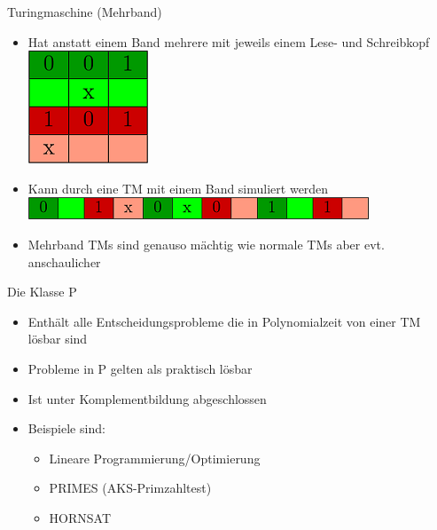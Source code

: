 \documentclass[ignorenonframetext,]{beamer}
\begin{document}
\begin{frame}{Turingmaschine (Mehrband)}

\begin{itemize}
\itemsep1pt\parskip0pt
\item
  Hat anstatt einem Band mehrere mit jeweils einem Lese- und
  Schreibkopf\\\includegraphics{img/TM1.png}
\item
  Kann durch eine TM mit einem Band simuliert
  werden\\\includegraphics{img/TM2.png}
\item
  Mehrband TMs sind genauso mächtig wie normale TMs aber evt.
  anschaulicher
\end{itemize}

\end{frame}

\begin{frame}{Die Klasse P}

\begin{itemize}
\itemsep1pt\parskip0pt
\item
  Enthält alle Entscheidungsprobleme die in Polynomialzeit von einer TM
  lösbar sind
\item
  Probleme in P gelten als praktisch lösbar
\item
  Ist unter Komplementbildung abgeschlossen
\item
  Beispiele sind:

  \begin{itemize}
  \itemsep1pt\parskip0pt
  \item
    Lineare Programmierung/Optimierung
  \item
    PRIMES (AKS-Primzahltest)
  \item
    HORNSAT
  \end{itemize}
\end{itemize}

\end{frame}
\end{document}

